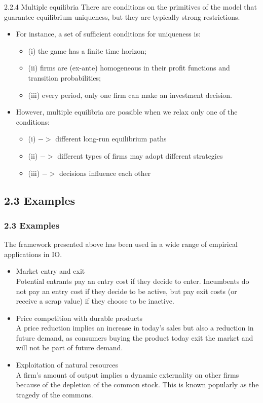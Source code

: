 \documentclass[aspectratio=169]{beamer}  %
\begin{document}
\begin{frame}
{2.2.4 Multiple equilibria}
There are conditions on the primitives of the model that guarantee equilibrium uniqueness, but they are typically strong restrictions.
\begin{itemize}
    \item For instance, a set of sufficient conditions for uniqueness is:
    \begin{itemize}
        \item (i) the game has a finite time horizon;
        \item (ii) firms are (ex-ante) homogeneous in their profit functions and transition probabilities;
        \item (iii) every period, only one firm can make an investment decision.
    \end{itemize}
    
    \item However, multiple equilibria are possible when we relax only one of the conditions:
    \begin{itemize}
        \item (i) $->$ different long-run equilibrium paths
        \item (ii) $->$ different types of firms may adopt different strategies
        \item (iii) $->$ decisions influence each other
    \end{itemize}
\end{itemize}

\end{frame}



\subsection{2.3 Examples}
\begin{frame}
\frametitle{2.3 Examples}
The framework presented above has been used in a wide range of empirical applications in IO.
    \begin{itemize}
        \item Market entry and exit
        \\Potential entrants pay an entry cost if they decide to enter. Incumbents do not pay an entry cost if they decide to be active, but pay exit costs (or receive a scrap value) if they choose to be inactive.
        \item Price competition with durable products
        \\A price reduction implies an increase in today’s sales but also a reduction in future demand, as consumers buying the product today exit the market and will not be part of future demand.
        \item Exploitation of natural resources
        \\A firm’s amount of output implies a dynamic externality on other firms because of the depletion of the common stock. This is known popularly as the tragedy of the commons.
        \end{itemize}
\end{frame}
\end{document}
